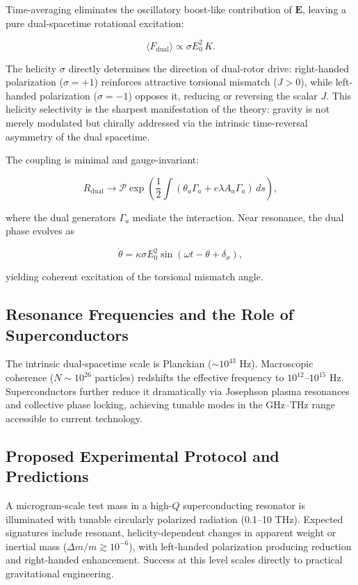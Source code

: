 \documentclass[dvipdfmx,a4paper]{article}
\begin{document}
Time-averaging eliminates the oscillatory boost-like contribution of $\mathbf{E}$, leaving a pure dual-spacetime rotational excitation:

\[
\langle F_{\text{dual}} \rangle \propto \sigma E_0^2 \, K.
\]

The helicity $\sigma$ directly determines the direction of dual-rotor drive: right-handed polarization ($\sigma = +1$) reinforces attractive torsional mismatch ($J > 0$), while left-handed polarization ($\sigma = -1$) opposes it, reducing or reversing the scalar $J$. This helicity selectivity is the sharpest manifestation of the theory: gravity is not merely modulated but chirally addressed via the intrinsic time-reversal asymmetry of the dual spacetime.

The coupling is minimal and gauge-invariant:

\[
R_{\text{dual}} \to \mathcal{P} \exp\!\left( \frac{1}{2} \int (\theta_a \Gamma_a + e \lambda A_a \Gamma_a) \, ds \right),
\]

where the dual generators $\Gamma_a$ mediate the interaction. Near resonance, the dual phase evolves as

\[
\dot{\theta} = \kappa \sigma E_0^2 \sin(\omega t - \theta + \delta_\sigma),
\]

yielding coherent excitation of the torsional mismatch angle.

\subsection{Resonance Frequencies and the Role of Superconductors}

The intrinsic dual-spacetime scale is Planckian ($\sim 10^{43}$ Hz). Macroscopic coherence ($N \sim 10^{26}$ particles) redshifts the effective frequency to $10^{12}$--$10^{15}$ Hz. Superconductors further reduce it dramatically via Josephson plasma resonances and collective phase locking, achieving tunable modes in the GHz--THz range accessible to current technology.

\subsection{Proposed Experimental Protocol and Predictions}

A microgram-scale test mass in a high-$Q$ superconducting resonator is illuminated with tunable circularly polarized radiation (0.1--10 THz). Expected signatures include resonant, helicity-dependent changes in apparent weight or inertial mass ($\Delta m/m \gtrsim 10^{-6}$), with left-handed polarization producing reduction and right-handed enhancement. Success at this level scales directly to practical gravitational engineering.
\end{document}
